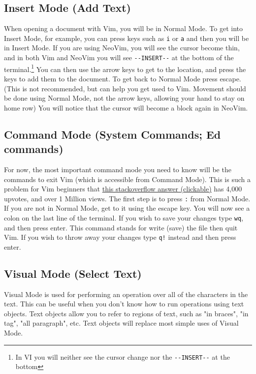 \documentclass[11pt]{article}
\begin{document}
\subsection{Insert Mode (Add Text)}
\label{sec:orgf564761}
When opening a document with Vim, you will be in Normal Mode. To get into Insert
Mode, for example, you can press keys such as \texttt{i} or \texttt{a} and then you will be in
Insert Mode. If you are using NeoVim, you will see the cursor become thin, and
in both Vim and NeoVim you will see \texttt{-{}-INSERT-{}-} at the bottom of the
terminal.\footnote{In VI you will neither see the cursor change nor the \texttt{-{}-INSERT-{}-} at the bottom} You can then use the arrow keys to get to the location, and
press the keys to add them to the document. To get back to Normal Mode press
escape. (This is not recommended, but can help you get used to Vim. Movement
should be done using Normal Mode, not the arrow keys, allowing your hand to stay
on home row) You will notice that the cursor will become a block again in
NeoVim.
\subsection{Command Mode (System Commands; Ed commands)}
\label{sec:org4e4c1f7}
For now, the most important command mode you need to know will be the commands
to exit Vim (which is accessible from Command Mode). This is such a problem for
Vim beginners that \href{https://stackoverflow.com/questions/11828270/how-to-exit-the-vim-editor}{this stackoverflow answer (clickable)} has 4,000 upvotes, and
over 1 Million views. The first step is to press \texttt{:} from Normal Mode. If you
are not in Normal Mode, get to it using the escape key. You will now see a colon
on the last line of the terminal. If you wish to save your changes type \texttt{wq},
and then press enter. This command stands for write (save) the file then quit
Vim. If you wish to throw away your changes type \texttt{q!} instead and then press enter.
\subsection{Visual Mode (Select Text)}
\label{sec:org31191c1}
Visual Mode is used for performing an operation over all of the characters in
the text. This can be useful when you don't know how to run operations using
text objects. Text objects allow you to refer to regions of text, such as "in
braces", "in tag", "all paragraph", etc. Text objects will replace most simple
uses of Visual Mode.
\end{document}

